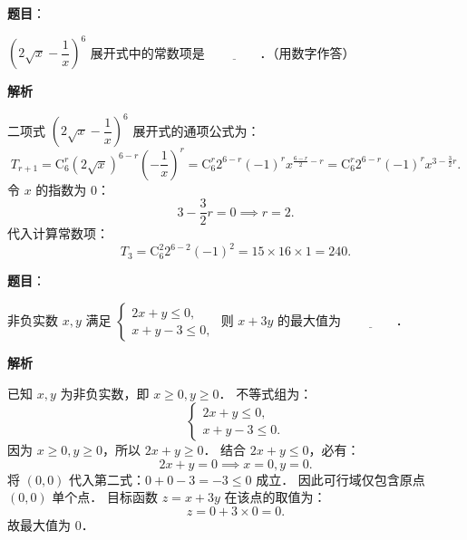 \begin{answer}

\textbf{题目}：

$\left(2\sqrt{x} - \dfrac{1}{x}\right)^6$ 展开式中的常数项是 $\underline{\qquad\qquad}$．（用数字作答）

\textbf{解析}

二项式 $\left(2\sqrt{x} - \dfrac{1}{x}\right)^6$ 展开式的通项公式为：
\nopagebreak[4]
\[
T_{r+1} = \mathrm{C}_6^r (2\sqrt{x})^{6-r} \left(-\frac{1}{x}\right)^r = \mathrm{C}_6^r 2^{6-r} (-1)^r x^{\frac{6-r}{2} - r} = \mathrm{C}_6^r 2^{6-r} (-1)^r x^{3 - \frac{3}{2}r}.
\]
令 $x$ 的指数为 0：
\nopagebreak[4]
\[
3 - \frac{3}{2}r = 0 \implies r = 2.
\]
代入计算常数项：
\nopagebreak[4]
\[
T_3 = \mathrm{C}_6^2 2^{6-2} (-1)^2 = 15 \times 16 \times 1 = 240.
\]


\end{answer}
\begin{answer}

\textbf{题目}：

非负实数 $x, y$ 满足 $\begin{cases} 2x + y \leqslant 0, \\ x + y - 3 \leqslant 0, \end{cases}$ 则 $x + 3y$ 的最大值为 $\underline{\qquad\qquad}$．

\textbf{解析}

已知 $x, y$ 为非负实数，即 $x \geqslant 0, y \geqslant 0$．
不等式组为：
\nopagebreak[4]
\[
\begin{cases}
2x + y \leqslant 0, \\
x + y - 3 \leqslant 0.
\end{cases}
\]
因为 $x \geqslant 0, y \geqslant 0$，所以 $2x + y \geqslant 0$．
结合 $2x + y \leqslant 0$，必有：
\nopagebreak[4]
\[
2x + y = 0 \implies x = 0, y = 0.
\]
将 $(0, 0)$ 代入第二式：$0 + 0 - 3 = -3 \leqslant 0$ 成立．
因此可行域仅包含原点 $(0, 0)$ 单个点．
目标函数 $z = x + 3y$ 在该点的取值为：
\nopagebreak[4]
\[
z = 0 + 3 \times 0 = 0.
\]
故最大值为 0．


\end{answer}
